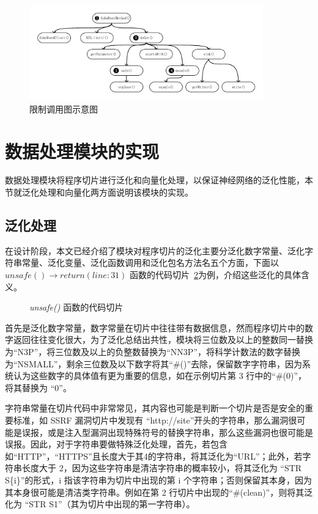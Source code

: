 \begin{figure}[!htb]
    \centering
    \includegraphics[width=0.9\textwidth]{FIGs/chapter4/prune.pdf}
    \caption{限制调用图示意图}\label{prune}
\end{figure}


\section{数据处理模块的实现}

数据处理模块将程序切片进行泛化和向量化处理，以保证神经网络的泛化性能，本节就泛化处理和向量化两方面说明该模块的实现。

\subsection{泛化处理}

在设计阶段，本文已经介绍了模块对程序切片的泛化主要分泛化数字常量、泛化字符串常量、泛化变量、泛化函数调用和泛化包名方法名五个方面，下面以 $unsafe() \rightarrow return(line:31)$ 函数的代码切片~\ref{code:sliceDemo}为例，介绍这些泛化的具体含义。

\begin{figure}[htbp]
    \centering
    \begin{minipage}{0.9\textwidth}
        
    \end{minipage}
    \caption{\textit{unsafe()} 函数的代码切片}\label{code:sliceDemo}
\end{figure}

首先是泛化数字常量，数字常量在切片中往往带有数据信息，然而程序切片中的数字返回往往变化很大，为了泛化总结出共性，模块将三位数及以上的整数同一替换为“N3P”，将三位数及以上的负整数替换为“NN3P”，将科学计数法的数字替换为“NSMALL”，剩余三位数及以下数字将其“\#()”去除，保留数字字符串，因为系统认为这些数字的具体值有更为重要的信息，如在示例切片第 3 行中的“\#(0)”，将其替换为 “0”。

字符串常量在切片代码中非常常见，其内容也可能是判断一个切片是否是安全的重要标准，如 SSRF 漏洞切片中发现有 “http://site”开头的字符串，那么漏洞很可能是误报，或是注入型漏洞出现特殊符号的替换字符串，那么这些漏洞也很可能是误报。因此，对于字符串要做特殊泛化处理，首先，若包含如“HTTP”，“HTTPS”且长度大于其4的字符串，将其泛化为“URL”；此外，若字符串长度大于 2，因为这些字符串是清洁字符串的概率较小，将其泛化为 “STR S\{i\}”的形式，i 指该字符串为切片中出现的第 i 个字符串；否则保留其本身，因为其本身很可能是清洁类字符串。例如在第 2 行切片中出现的“\#(clean)”，则将其泛化为 “STR S1”（其为切片中出现的第一字符串）。

